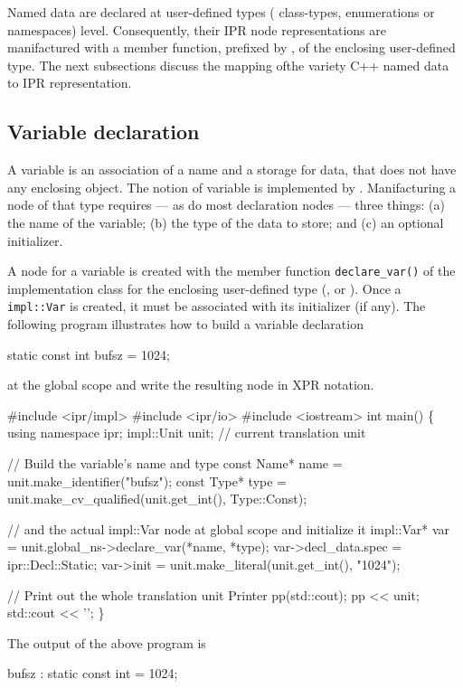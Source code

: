 \documentclass[11pt]{article}
\begin{document}
Named data are declared at user-defined types (\ie{} class-types,
enumerations or namespaces) level.  Consequently, their IPR node
representations are  manifactured with a member function, prefixed by
, of the enclosing user-defined type. The next subsections
discuss the mapping ofthe variety C++ named data to IPR representation.

\subsection{Variable declaration}
\label{sec:decl.variable}

A variable is an association of a name and a storage for data, that does not
have any enclosing object. The notion of variable is implemented by
.  Manifacturing a node of that type requires ---
as do most declaration nodes --- three things: (a) the name of the variable;
(b) the type of the data to store; and (c) an optional initializer.

A node for a variable is created with the member function
\texttt{declare\_var()} of the implementation class for the enclosing
user-defined type (,  or
).  Once a \texttt{impl::Var} is
created, it must be 
associated with its initializer (if any).  The following program
illustrates how to build a variable declaration 
\begin{Program}
  static const int bufsz = 1024;
\end{Program}
at the global scope and write the resulting node in XPR notation.
\begin{Program}
#include <ipr/impl>
#include <ipr/io>
#include <iostream>
int main()
\{
   using namespace ipr;
   impl::Unit unit;              // current translation unit
   
   // Build the variable's name and type
   const Name* name = unit.make_identifier("bufsz");
   const Type* type = unit.make_cv_qualified(unit.get_int(), Type::Const);

   // and the actual impl::Var node at global scope and initialize it
   impl::Var* var = unit.global_ns->declare_var(*name, *type);
   var->decl_data.spec = ipr::Decl::Static;
   var->init = unit.make_literal(unit.get_int(), "1024");
   
   // Print out the whole translation unit
   Printer pp(std::cout);
   pp << unit;
   std::cout << '';
\}
\end{Program}
The output of the above program is
\begin{Output}
  bufsz : static const int = 1024;
\end{Output}
\end{document}
